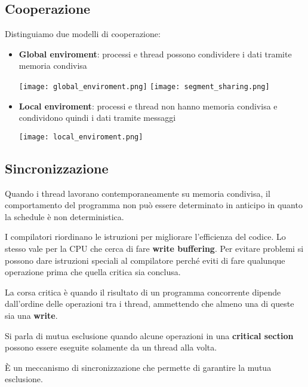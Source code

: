 \subsection{Cooperazione}
Distinguiamo due modelli di cooperazione:
\begin{itemize}
	\item \textbf{Global enviroment}: processi e thread possono condividere i dati tramite memoria condivisa
	\begin{center}
		\texttt{[image: global\_enviroment.png]}
		\texttt{[image: segment\_sharing.png]}
	\end{center}
	\item \textbf{Local enviroment}: processi e thread non hanno memoria condivisa e condividono quindi i dati tramite messaggi
	\begin{center}
		\texttt{[image: local\_enviroment.png]}
	\end{center}
\end{itemize}

\subsection{Sincronizzazione}
Quando i thread lavorano contemporaneamente su memoria condivisa, il comportamento del programma non può essere determinato in anticipo in quanto la schedule è non deterministica.
\begin{observation}[Reordering]
	I compilatori riordinano le istruzioni per migliorare l'efficienza del codice. Lo stesso vale per la CPU che cerca di fare \textbf{write buffering}. Per evitare problemi si possono dare istruzioni speciali al compilatore perché eviti di fare qualunque operazione prima che quella critica sia conclusa.
\end{observation}

\begin{definition}
	La corsa critica è quando il risultato di un programma concorrente dipende dall'ordine delle operazioni tra i thread, ammettendo che almeno una di queste sia una \textbf{write}.
\end{definition}
\begin{definition}
	Si parla di mutua esclusione quando alcune operazioni in una \textbf{critical section} possono essere eseguite solamente da un thread alla volta.
\end{definition}
\begin{definition}[Lock]
	È un meccanismo di sincronizzazione che permette di garantire la mutua esclusione.
\end{definition}

